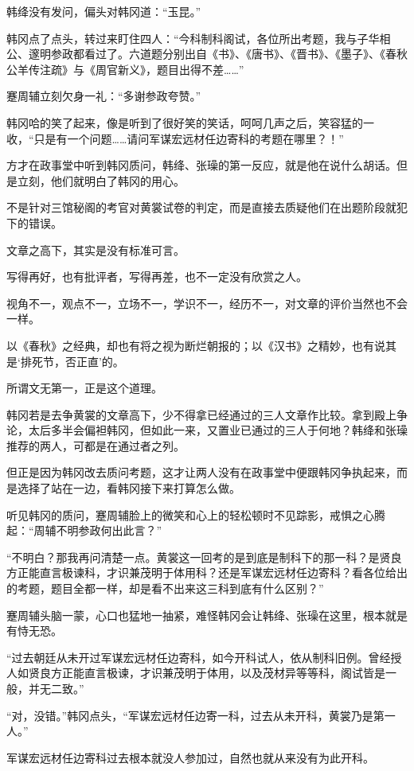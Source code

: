韩绛没有发问，偏头对韩冈道：“玉昆。”

韩冈点了点头，转过来盯住四人：“今科制科阁试，各位所出考题，我与子华相公、邃明参政都看过了。六道题分别出自《书》、《唐书》、《晋书》、《墨子》、《春秋公羊传注疏》与《周官新义》，题目出得不差……”

蹇周辅立刻欠身一礼：“多谢参政夸赞。”

韩冈哈的笑了起来，像是听到了很好笑的笑话，呵呵几声之后，笑容猛的一收，“只是有一个问题……请问军谋宏远材任边寄科的考题在哪里？！”

方才在政事堂中听到韩冈质问，韩绛、张璪的第一反应，就是他在说什么胡话。但是立刻，他们就明白了韩冈的用心。

不是针对三馆秘阁的考官对黄裳试卷的判定，而是直接去质疑他们在出题阶段就犯下的错误。

文章之高下，其实是没有标准可言。

写得再好，也有批评者，写得再差，也不一定没有欣赏之人。

视角不一，观点不一，立场不一，学识不一，经历不一，对文章的评价当然也不会一样。

以《春秋》之经典，却也有将之视为断烂朝报的；以《汉书》之精妙，也有说其是‘排死节，否正直’的。

所谓文无第一，正是这个道理。

韩冈若是去争黄裳的文章高下，少不得拿已经通过的三人文章作比较。拿到殿上争论，太后多半会偏袒韩冈，但如此一来，又置业已通过的三人于何地？韩绛和张璪推荐的两人，可都是在通过者之列。

但正是因为韩冈改去质问考题，这才让两人没有在政事堂中便跟韩冈争执起来，而是选择了站在一边，看韩冈接下来打算怎么做。

听见韩冈的质问，蹇周辅脸上的微笑和心上的轻松顿时不见踪影，戒惧之心腾起：“周辅不明参政何出此言？”

“不明白？那我再问清楚一点。黄裳这一回考的是到底是制科下的那一科？是贤良方正能直言极谏科，才识兼茂明于体用科？还是军谋宏远材任边寄科？看各位给出的考题，题目全都一样，却是看不出来这三科到底有什么区别？”

蹇周辅头脑一蒙，心口也猛地一抽紧，难怪韩冈会让韩绛、张璪在这里，根本就是有恃无恐。

“过去朝廷从未开过军谋宏远材任边寄科，如今开科试人，依从制科旧例。曾经授人如贤良方正能直言极谏，才识兼茂明于体用，以及茂材异等等科，阁试皆是一般，并无二致。”

“对，没错。”韩冈点头，“军谋宏远材任边寄一科，过去从未开科，黄裳乃是第一人。”

军谋宏远材任边寄科过去根本就没人参加过，自然也就从来没有为此开科。


